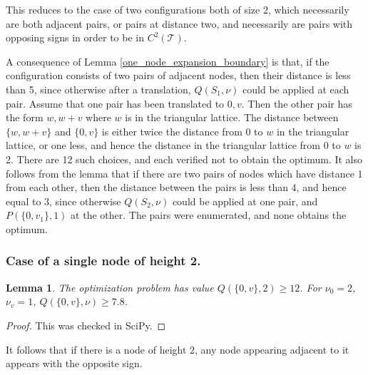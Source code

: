 \documentclass[a4paper, 12pt, notitlepage]{amsart}
\newcommand{\sT}{\mathscr{T}}
\newtheorem{lemma}[theorem]{Lemma}
\theoremstyle{remark}
\begin{document}
 This reduces to the case of two configurations both of size 2, which necessarily are both adjacent pairs, or pairs at distance two, and necessarily are pairs with opposing signs in order to be in $C^2(\sT)$.

A consequence of Lemma \ref{one_node_expansion_boundary} is that, if the configuration consists of two pairs of adjacent nodes, then their distance is less than 5, since otherwise after a translation, $Q(S_1, \nu)$ could be applied at each pair.  Assume that one pair has been translated to $0, v$.  Then the other pair has the form $w, w+v$ where $w$ is in the triangular lattice.  The distance between $\{w, w+v\}$ and $\{0, v\}$ is either twice the distance from 0 to $w$ in the triangular lattice, or one less, and hence the distance in the triangular lattice from 0 to $w$ is 2.  There are 12 such choices, and each verified not to obtain the optimum.  It also follows from the lemma that if there are two pairs of nodes which have distance 1 from each other, then the distance between the pairs is less than 4, and hence equal to 3, since otherwise $Q(S_2, \nu)$ could be applied at one pair, and $P(\{0, v_1\}, 1)$ at the other.  The pairs were enumerated, and none obtains the optimum.
 
 
\subsubsection*{Case of a single node of height 2.}  \begin{lemma}
  The optimization problem has value $Q(\{0, v\}, 2) \geq 12$.  For $\nu_0= 2$, $\nu_v = 1$, $Q(\{0, v\}, \nu) \geq 7.8$.
 \end{lemma}
\begin{proof}
 This was checked in SciPy.
\end{proof}
It follows that if there is a node of height 2, any node appearing adjacent to it appears with the opposite sign.
\end{document}
